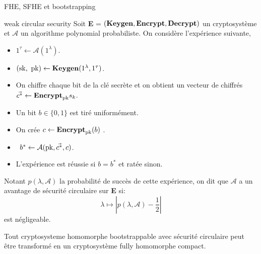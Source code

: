 \begin{section}{FHE, SFHE et bootstrapping}
\begin{definition}{weak circular security}
\label{def:circular}
Soit \textbf{E} = $(\text{\textbf{Keygen}}, \text{\textbf{Encrypt}}, \text{\textbf{Decrypt}})$ un cryptosystème et $\mathcal{A}$ un
algorithme polynomial probabiliste. 
On considère l'expérience suivante, 
\begin{itemize}
\item $1^\tau \leftarrow \mathcal{A}(1^\lambda)$.
\item $(\sk, \pk) \leftarrow \Keygen(1^\lambda, 1^\tau)$.
\item On chiffre chaque bit de la clé secrète et on obtient un vecteur de chiffrés $\vec{c^*} \leftarrow \text{\textbf{Encrypt}}_{\text{pk}}{s_k}$.
\item Un bit $b\in \{0,1\}$ est tiré uniformément.
\item On crée $c \leftarrow \text{\textbf{Encrypt}}_{\text{pk}}(b)$ .
\item $b^* \leftarrow \mathcal{A}(\text{pk}, \vec{c^*}, c)$.
\item L'expérience est réussie si $b = b^*$ et ratée sinon.
\end{itemize}
Notant $p(\lambda, \mathcal{A})$ la probabilité de succès de cette expérience, on dit
que $\mathcal{A}$ a un avantage de sécurité circulaire sur \textbf{E} si:
\[\lambda \mapsto |p(\lambda, \mathcal{A}) - \frac{1}{2}| \]
est négligeable.
\end{definition}

\begin{thm}
Tout cryptosysteme homomorphe bootstrappable avec sécurité circulaire peut être transformé en un 
cryptosystème fully homomorphe compact.
\end{thm}
\end{section}

